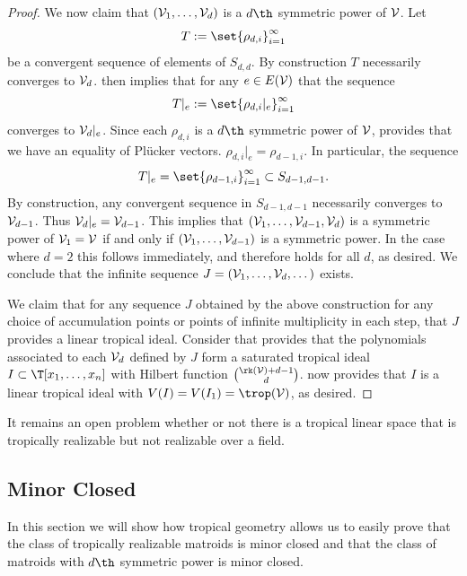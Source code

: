 \begin{proof}
We now claim that $(\mathcal{V}_1,\dots,\mathcal{V}_d)$ is a $d\th$ symmetric power of $\mathcal{V}$. Let 
$$T:=\set{\rho_{d,i}}_{i=1}^\infty$$
be a convergent sequence of elements of $S_{d,d}$. By construction $T$ necessarily converges to $\mathcal{V}_d$.  then implies that for any $e \in E(\mathcal{V})$ that the sequence
$$T|_e:=\set{\rho_{d,i}|_{e}}_{i=1}^\infty$$
converges to $\mathcal{V}_d|_e$. Since each $\rho_{d,i}$ is a $d\th$ symmetric power of $\mathcal{V}$,  provides that we have an equality of Pl\"ucker vectors. $\rho_{d,i}|_{e}=\rho_{d-1,i}$.
In particular, the sequence
$$T|_e = \set{\rho_{d-1,i}}_{i=1}^\infty\subset S_{d-1,d-1}.$$
By construction, any convergent sequence in $S_{d-1,d-1}$ necessarily converges to $\mathcal{V}_{d-1}$. Thus $\mathcal{V}_d|_e=\mathcal{V}_{d-1}$. This implies that $(\mathcal{V}_1,\dots,\mathcal{V}_{d-1},\mathcal{V}_d)$ is a symmetric power of $\mathcal{V}_1=\mathcal{V}$ if and only if $(\mathcal{V}_1,\dots,\mathcal{V}_{d-1})$ is a symmetric power. In the case where $d=2$ this follows immediately, and therefore holds for all $d$, as desired. We conclude that the infinite sequence $J=(\mathcal{V}_1,\dots,\mathcal{V}_d, \dots)$ exists.

We claim that for any sequence $J$ obtained by the above construction for any choice of accumulation points or points of infinite multiplicity in each step, that $J$ provides a linear tropical ideal. Consider that  provides that the polynomials associated to each $\mathcal{V}_d$ defined by $J$ form a saturated tropical ideal $I\subset \T[x_1,\dots,x_n]$ with Hilbert function $\binom{\rk(\sV)+d-1}{d}$.  now provides that $I$ is a linear tropical ideal with $V(I)=V(I_1)=\trop(\sV)$, as desired.
\end{proof}

\begin{remark}
It remains an open problem whether or not there is a tropical linear space that is tropically realizable but not realizable over a field. 
\end{remark}

\subsection{Minor Closed}\label{subsec:minorsLinTropIdeals}
    In this section we will show how tropical geometry allows us to easily prove that the class of tropically realizable matroids is minor closed and that the class of matroids with $d\th$ symmetric power is minor closed.
    

